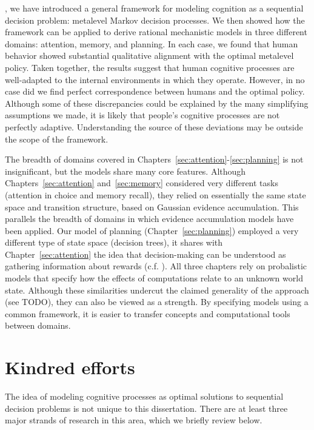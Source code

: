 \label{conclusion}


, we have introduced a general framework for modeling cognition as a sequential decision problem: metalevel Markov decision processes. We then showed how the framework can be applied to derive rational mechanistic models in three different domains: attention, memory, and planning. In each case, we found that human behavior showed substantial qualitative alignment with the optimal metalevel policy. Taken together, the results suggest that human cognitive processes are well-adapted to the internal environments in which they operate. However, in no case did we find perfect correspondence between humans and the optimal policy. Although some of these discrepancies could be explained by the many simplifying assumptions we made, it is likely that people's cognitive processes are not perfectly adaptive. Understanding the source of these deviations may be outside the scope of the framework.

The breadth of domains covered in Chapters~\ref{sec:attention}-\ref{sec:planning} is not insignificant, but the models share many core features. Although Chapters~\ref{sec:attention} and~\ref{sec:memory} considered very different tasks (attention in choice and memory recall), they relied on essentially the same state space and transition structure, based on Gaussian evidence accumulation. This parallels the breadth of domains in which evidence accumulation models have been applied. Our model of planning (Chapter~\ref{sec:planning}) employed a very different type of state space (decision trees), it shares with Chapter~\ref{sec:attention} the idea that decision-making can be understood as gathering information about rewards (c.f. \citealp{tajima2016optimal,sezener2019optimizing}). All three chapters rely on probalistic models that specify how the effects of computations relate to an unknown world state. Although these similarities undercut the claimed generality of the approach (see TODO), they can also be viewed as a strength. By specifying models using a common framework, it is easier to transfer concepts and computational tools between domains.

\section{Kindred efforts}

The idea of modeling cognitive processes as optimal solutions to sequential decision problems is not unique to this dissertation. There are at least three major strands of research in this area, which we briefly review below.

